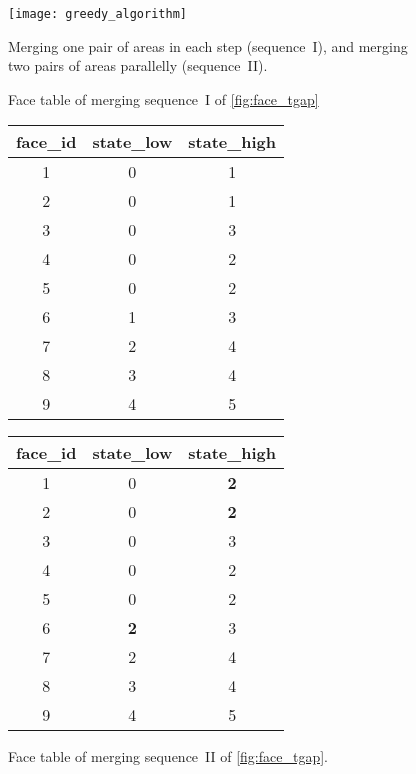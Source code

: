 \documentclass[ijgi,article,submit,moreauthors,pdftex]{Definitions/mdpi}
\begin{document}
\begin{figure}[tb]
\centering
\texttt{[image: greedy\_algorithm]}
\caption{Merging one pair of areas in each step (sequence~I), 
    and merging two pairs of areas parallelly (sequence~II).}
\label{fig:face_tgap}
\vspace{6mm} %
%
%
%
\captionsetup*{type=table} %
\parbox{.49\linewidth}{
\caption{Face table of merging sequence~I 
    of \fig\ref{fig:face_tgap}}
\label{tab:face_tgap}
\centering
\begin{tabular}{ccc}
\hline
face\_id &   state\_low   & state\_high    \\ \hline
1       &     0         &     1          \\
2       &     0         &     1          \\
3       &     0         &     3          \\ 
4       &     0         &     2          \\
5       &     0         &     2          \\
6       &     1         &     3          \\         
7       &     2         &     4          \\
8       &     3         &     4          \\ 
9       &     4         &     5          \\ \hline
\end{tabular}
}
%
%
\parbox{.49\linewidth}{
\caption{Face table of merging sequence~II 
    of \fig\ref{fig:face_tgap}.
}
\label{tab:face_tgap_parallel}
\centering
\begin{tabular}{ccc} %
\hline
face\_id &   state\_low   & state\_high    \\ \hline
1       &     0         &     \textbf{2}          \\
2       &     0         &     \textbf{2}          \\
3       &     0         &     3          \\ 
4       &     0         &     2          \\
5       &     0         &     2          \\
6       &  \textbf{2}   &     3          \\         
7       &     2         &     4          \\
8       &     3         &     4          \\ 
9       &     4         &     5          \\ \hline
\end{tabular}
}
\end{figure}
\end{document}
